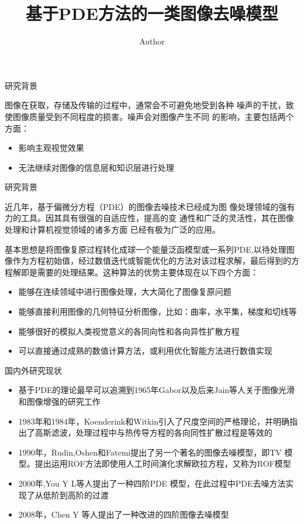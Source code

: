 \documentclass{beamer}
\begin{document}
\title{{\fangsong 基于PDE方法的一类图像去噪模型}}
\author{Author}
\frame{\titlepage}

\begin{frame}{{\fangsong 研究背景}}

{\kaishu 图像在获取，存储及传输的过程中，通常会不可避免地受到各种
噪声的干扰，致使图像质量受到不同程度的损害。噪声会对图像产生不同
的影响，主要包括两个方面：}
\begin{itemize}
\item {\kaishu 影响主观视觉效果}
\item {\kaishu 无法继续对图像的信息层和知识层进行处理}
\end{itemize}
\end{frame}


\begin{frame}{{\fangsong 研究背景}}

\begin{footnotesize}
{\kaishu 近几年，基于偏微分方程（PDE）的图像去噪技术已经成为图
         像处理领域的强有力的工具。因其具有很强的自适应性，提高的变
通性和广泛的灵活性，其在图像处理和计算机视觉领域的诸多方面
已经有极为广泛的应用。

基本思想是将图像复原过程转化成球一个能量泛函模型或一系列PDE,以待处理图像作为方程初始值，经过数值迭代或智能优化的方法对该过程求解，最后得到的方程解即是需要的处理结果。这种算法的优势主要体现在以下四个方面：}
\begin{itemize}
\item {\kaishu 能够在连续领域中进行图像处理，大大简化了图像复原问题}
\item {\kaishu 能够直接利用图像的几何特征分析图像，比如：曲率，水平集，梯度和切线等}
\item {\kaishu 能够很好的模拟人类视觉意义的各同向性和各向异性扩散方程}
\item {\kaishu 可以直接通过成熟的数值计算方法，或利用优化智能方法进行数值实现}
\end{itemize}
\end{footnotesize}
\end{frame}
\begin{frame}{{\fangsong 国内外研究现状}}
\begin{footnotesize}
\begin{itemize}
\item {\kaishu 基于PDE的理论最早可以追溯到1965年Gabor以及后来Jain等人关于图像光滑和图像增强的研究工作}
\item {\kaishu 1983年和1984年，Koenderink和Witkin引入了尺度空间的严格理论，并明确指出了高斯滤波，处理过程中与热传导方程的各向同性扩散过程是等效的}
\item {\kaishu 1990年，Rudin,Oshen和Fatemi提出了另一个著名的图像去噪模型，即TV 模型。提出运用ROF方法即使用人工时间演化求解欧拉方程，又称为ROF模型}
\item {\kaishu 2000年,You Y L等人提出了一种四阶PDE 模型，在此过程中PDE去噪方法实现了从低阶到高阶的过渡}
\item {\kaishu 2008年，Chen Y 等人提出了一种改进的四阶图像去噪模型}
\end{itemize}
\end{footnotesize}
\end{frame}
\end{document}

